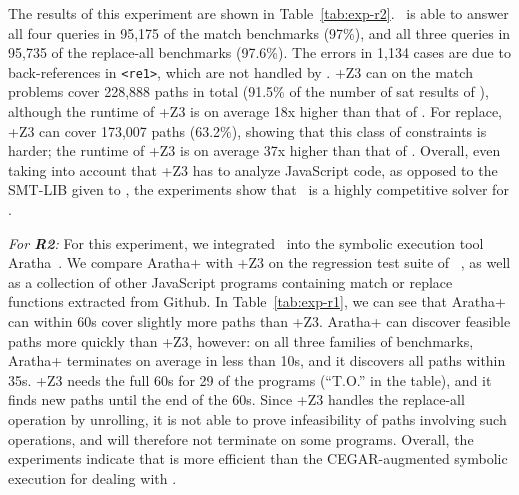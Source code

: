 The results of this experiment are shown in
Table~\ref{tab:exp-r2}. \ostrich\ is able to answer all four queries
in 95,175 of the match benchmarks (97\%), and all three queries in
95,735 of the replace-all benchmarks (97.6\%). The errors in 1,134 cases
are due to back-references in \verb!<re1>!, which are not handled by
\ostrich. \expose{}+Z3 can on the match problems cover 228,888 paths in
total (91.5\% of the number of sat results of \ostrich), although the
runtime of \expose{}+Z3 is on average 18x higher than that of
\ostrich. For replace, \expose{}+Z3 can cover 173,007 paths (63.2\%),
showing that this class of constraints is harder; the runtime of
\expose{}+Z3 is on average 37x higher than that of \ostrich.  Overall,
even taking into account that \expose{}+Z3 has to analyze JavaScript
code, as opposed to the SMT-LIB given to \ostrich, the experiments
show that \ostrich\ is a highly competitive solver for \regexps.

\smallskip
{\em For \textbf{R2}:} For this experiment,
we  integrated \ostrich\ into the symbolic
execution tool Aratha~\cite{aratha}.  We compare Aratha+{\ostrich} with
\expose{}+Z3 on the regression test suite of \expose{}~\cite{DBLP:conf/spin/LoringMK17},
as well as a collection of other JavaScript programs containing match or replace
functions extracted from Github. In
Table~\ref{tab:exp-r1}, we can see that Aratha+{\ostrich} can within
60s cover slightly more paths than \expose{}+Z3. Aratha+{\ostrich} can
discover feasible paths more quickly than \expose{}+Z3, however: on
all three families of benchmarks, Aratha+{\ostrich} terminates on
average in less than 10s, and it discovers all paths 
within 35s. \expose{}+Z3 needs the full 60s for
29 of the programs (``T.O.'' in the table),
and it finds new paths until the end of the 60s. Since \expose{}+Z3
handles the replace-all operation by unrolling, it is not able to
prove infeasibility of paths involving such operations, and will
therefore not terminate on some programs.
Overall, the experiments indicate that {\ostrich} is more
efficient than the CEGAR-augmented symbolic execution for dealing
with \regexps.



